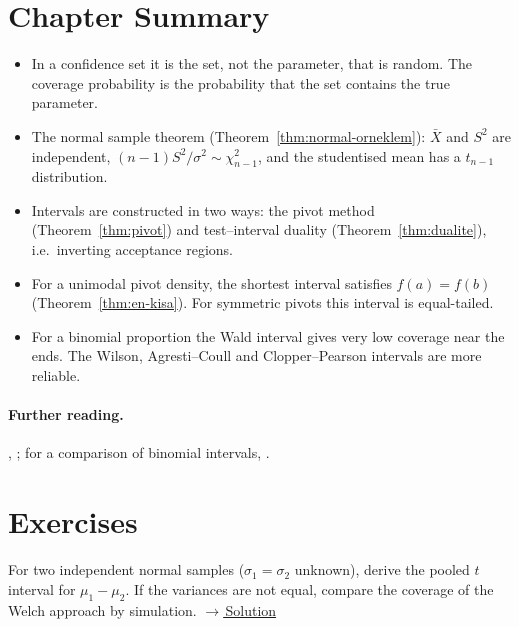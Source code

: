 \documentclass[main.tex]{subfiles}
\begin{document}
\section{Chapter Summary}
\begin{summary}
\begin{itemize}
  \item In a confidence set it is the set, not the parameter, that is random. The coverage probability is the probability that the set contains the true parameter.
  \item The normal sample theorem (Theorem~\ref{thm:normal-orneklem}): $\bar X$ and $S^2$ are independent, $(n-1)S^2/\sigma^2\sim\chi^2_{n-1}$, and the studentised mean has a $t_{n-1}$ distribution.
  \item Intervals are constructed in two ways: the pivot method (Theorem~\ref{thm:pivot}) and test--interval duality (Theorem~\ref{thm:dualite}), i.e.\ inverting acceptance regions.
  \item For a unimodal pivot density, the shortest interval satisfies $f(a)=f(b)$ (Theorem~\ref{thm:en-kisa}). For symmetric pivots this interval is equal-tailed.
  \item For a binomial proportion the Wald interval gives very low coverage near the ends. The Wilson, Agresti--Coull and Clopper--Pearson intervals are more reliable.
\end{itemize}
\end{summary}

\paragraph{Further reading.} \cite[Chapter~9]{casella}, \cite[Section~3.5 and Chapter~5]{lehmann-romano}; for a comparison of binomial intervals, \cite{brown-cai}.

\section{Exercises}

\begin{exercise}\label{exr:16-1}
For two independent normal samples ($\sigma_1=\sigma_2$ unknown), derive the pooled $t$ interval for $\mu_1-\mu_2$. If the variances are not equal, compare the coverage of the Welch \cite{welch47} approach by simulation.
\hfill\hyperref[coz:16-1]{\footnotesize$\rightarrow$\,Solution}
\end{exercise}
\end{document}
